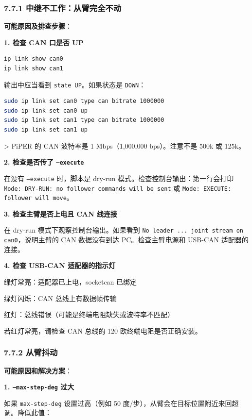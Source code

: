 \documentclass[UTF8,a4paper,11pt]{ctexart}
\begin{document}
{\subsubsection{7.7.1 中继不工作：从臂完全不动}

\textbf{可能原因及排查步骤}：

\textbf{1. 检查 CAN 口是否 UP}

\begin{lstlisting}[language=bash]
ip link show can0
ip link show can1
\end{lstlisting}

输出中应当看到 \texttt{state UP}。如果状态是 \texttt{DOWN}：

\begin{lstlisting}[language=bash]
sudo ip link set can0 type can bitrate 1000000
sudo ip link set can0 up
sudo ip link set can1 type can bitrate 1000000
sudo ip link set can1 up
\end{lstlisting}

> PiPER 的 CAN 波特率是 1 Mbps（1,000,000 bps）。注意不是 500k 或 125k。

\textbf{2. 检查是否传了 \texttt{--execute}}

在没有 \texttt{--execute} 时，脚本是 dry-run 模式。检查控制台输出：第一行会打印 \texttt{Mode: DRY-RUN: no follower commands will be sent} 或 \texttt{Mode: EXECUTE: follower will move}。

\textbf{3. 检查主臂是否上电且 CAN 线连接}

在 dry-run 模式下观察控制台输出。如果看到 \texttt{No leader ... joint stream on can0}，说明主臂的 CAN 数据没有到达 PC。检查主臂电源和 USB-CAN 适配器的连接。

\textbf{4. 检查 USB-CAN 适配器的指示灯}

\item 绿灯常亮：适配器已上电，socketcan 已绑定
\item 绿灯闪烁：CAN 总线上有数据帧传输
\item 红灯：总线错误（可能是终端电阻缺失或波特率不匹配）

若红灯常亮，请检查 CAN 总线的 120 欧终端电阻是否正确安装。

\subsubsection{7.7.2 从臂抖动}

\textbf{可能原因和解决方案}：

\textbf{1. \texttt{--max-step-deg} 过大}

如果 \texttt{max-step-deg} 设置过高（例如 50 度/步），从臂会在目标位置附近来回超调。降低此值：

}
\end{document}
